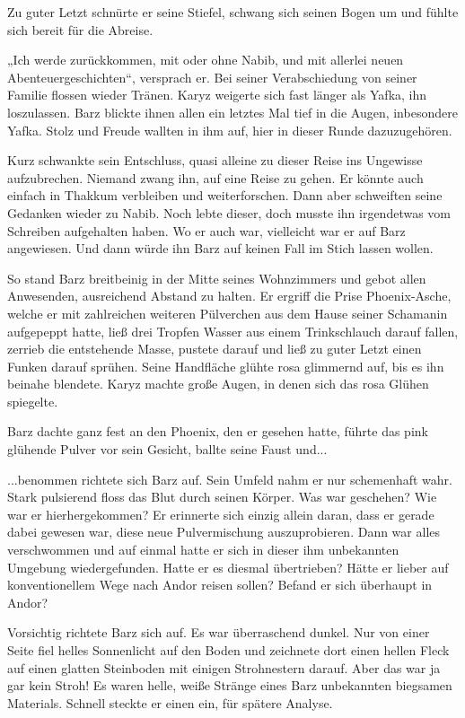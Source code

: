 Zu guter Letzt schnürte er seine Stiefel, schwang sich seinen Bogen um und fühlte sich bereit für die Abreise.

„Ich werde zurückkommen, mit oder ohne Nabib, und mit allerlei neuen Abenteuergeschichten“, versprach er. Bei seiner Verabschiedung von seiner Familie flossen wieder Tränen. Karyz weigerte sich fast länger als Yafka, ihn loszulassen. Barz blickte ihnen allen ein letztes Mal tief in die Augen, inbesondere Yafka. Stolz und Freude wallten in ihm auf, hier in dieser Runde dazuzugehören.

Kurz schwankte sein Entschluss, quasi alleine zu dieser Reise ins Ungewisse aufzubrechen. Niemand zwang ihn, auf eine Reise zu gehen. Er könnte auch einfach in Thakkum verbleiben und weiterforschen. Dann aber schweiften seine Gedanken wieder zu Nabib. Noch lebte dieser, doch musste ihn irgendetwas vom Schreiben aufgehalten haben. Wo er auch war, vielleicht war er auf Barz angewiesen. Und dann würde ihn Barz auf keinen Fall im Stich lassen wollen.

So stand Barz breitbeinig in der Mitte seines Wohnzimmers und gebot allen Anwesenden, ausreichend Abstand zu halten. Er ergriff die Prise Phoenix-Asche, welche er mit zahlreichen weiteren Pülverchen aus dem Hause seiner Schamanin aufgepeppt hatte, ließ drei Tropfen Wasser aus einem Trinkschlauch darauf fallen, zerrieb die entstehende Masse, pustete darauf und ließ zu guter Letzt einen Funken darauf sprühen. Seine Handfläche glühte rosa glimmernd auf, bis es ihn beinahe blendete. Karyz machte große Augen, in denen sich das rosa Glühen spiegelte.

Barz dachte ganz fest an den Phoenix, den er gesehen hatte, führte das pink glühende Pulver vor sein Gesicht, ballte seine Faust und...\bigskip



...benommen richtete sich Barz auf. Sein Umfeld nahm er nur schemenhaft wahr. Stark pulsierend floss das Blut durch seinen Körper. Was war geschehen? Wie war er hierhergekommen? Er erinnerte sich einzig allein daran, dass er gerade dabei gewesen war, diese neue Pulvermischung auszuprobieren. Dann war alles verschwommen und auf einmal hatte er sich in dieser ihm unbekannten Umgebung wiedergefunden. Hatte er es diesmal übertrieben? Hätte er lieber auf konventionellem Wege nach Andor reisen sollen? Befand er sich überhaupt in Andor?

Vorsichtig richtete Barz sich auf. Es war überraschend dunkel. Nur von einer Seite fiel helles Sonnenlicht auf den Boden und zeichnete dort einen hellen Fleck auf einen glatten Steinboden mit einigen Strohnestern darauf. Aber das war ja gar kein Stroh! Es waren helle, weiße Stränge eines Barz unbekannten biegsamen Materials. Schnell steckte er einen ein, für spätere Analyse.

